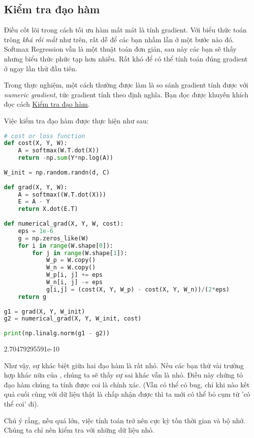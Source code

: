  
 
 
\subsection{Kiểm tra đạo hàm }
Điều cốt lõi trong cách tối ưu hàm mất mát là tính gradient. Với biểu thức toán trông \textit{khá rối mắt} như trên, rất dễ để các bạn nhầm lẫn ở một bước nào đó. Softmax Regression vẫn là một thuật toán đơn giản, sau này các bạn sẽ thấy nhưng biểu thức phức tạp hơn nhiều. Rất khó để có thể tính toán đúng gradient ở ngay lần thử đầu tiên.  
 
Trong thực nghiệm, một cách thường được làm là so sánh gradient tính được với \textit{numeric gradient}, tức gradient tính theo định nghĩa. Bạn đọc được khuyến khích đọc cách \href{http://machinelearningcoban.com/2017/01/12/gradientdescent/#kiem-tra-dao-ham}{Kiểm tra đạo hàm}.  
 
Việc kiểm tra đạo hàm được thực hiện như sau:  
 
\begin{lstlisting}[language=Python]
# cost or loss function   
def cost(X, Y, W): 
    A = softmax(W.T.dot(X)) 
    return -np.sum(Y*np.log(A)) 
 
W_init = np.random.randn(d, C) 
 
def grad(X, Y, W): 
    A = softmax((W.T.dot(X))) 
    E = A - Y 
    return X.dot(E.T) 
     
def numerical_grad(X, Y, W, cost): 
    eps = 1e-6 
    g = np.zeros_like(W) 
    for i in range(W.shape[0]): 
        for j in range(W.shape[1]): 
            W_p = W.copy() 
            W_n = W.copy() 
            W_p[i, j] += eps  
            W_n[i, j] -= eps 
            g[i,j] = (cost(X, Y, W_p) - cost(X, Y, W_n))/(2*eps) 
    return g  
 
g1 = grad(X, Y, W_init) 
g2 = numerical_grad(X, Y, W_init, cost) 
 
print(np.linalg.norm(g1 - g2)) 
\end{lstlisting}
 
    2.70479295591e-10 
 
 
Như vậy, sự khác biệt giữa hai đạo hàm là rất nhỏ. Nếu các bạn thử vài trường hợp khác nữa của , chúng ta sẽ thấy sự sai khác vẫn là nhỏ. Điều này chứng tỏ đạo hàm chúng ta tính được coi là chính xác. (Vẫn có thể có bug, chỉ khi nào kết quả cuối cùng với dữ liệu thật là chấp nhận được thì ta mới có thể bỏ cụm từ 'có thể coi' đi). 
 
Chú ý rằng, nếu  quá lớn, việc tính toán  trở nên cực kỳ tốn thời gian và bộ nhớ. Chúng ta chỉ nên kiểm tra với những dữ liệu nhỏ. 
 
